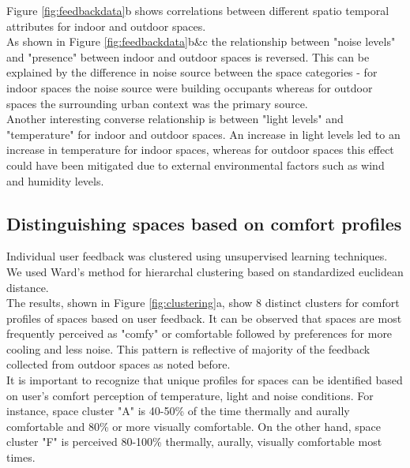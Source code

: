 Figure \ref{fig:feedbackdata}b shows correlations between different spatio temporal attributes for indoor and outdoor spaces.\\

As shown in Figure \ref{fig:feedbackdata}b\&c the relationship between "noise levels" and "presence" between indoor and outdoor spaces is reversed. This can be explained by the difference in noise source between the space categories - for indoor spaces the noise source were building occupants whereas for outdoor spaces the surrounding urban context was the primary source.\\

Another interesting converse relationship is between "light levels" and "temperature" for indoor and outdoor spaces. An increase in light levels led to an increase in temperature for indoor spaces, whereas for outdoor spaces this effect could have been mitigated due to external environmental factors such as wind and humidity levels.\\



\subsection{Distinguishing spaces based on comfort profiles}
\label{ch:userResults}

Individual user feedback was clustered using unsupervised learning techniques. We used Ward's method for hierarchal clustering based on standardized euclidean distance.\\

The results, shown in Figure \ref{fig:clustering}a, show 8 distinct clusters for comfort profiles of spaces based on user feedback. It can be observed that spaces are most frequently perceived as "comfy" or comfortable followed by preferences for more cooling and less noise. This pattern is reflective of majority of the feedback collected from outdoor spaces as noted before.\\

It is important to recognize that unique profiles for spaces can be identified based on user's comfort perception of temperature, light and noise conditions. For instance, space cluster "A" is 40-50\% of the time thermally and aurally comfortable and 80\% or more visually comfortable. On the other hand, space cluster "F" is perceived 80-100\% thermally, aurally, visually comfortable most times.\\           


